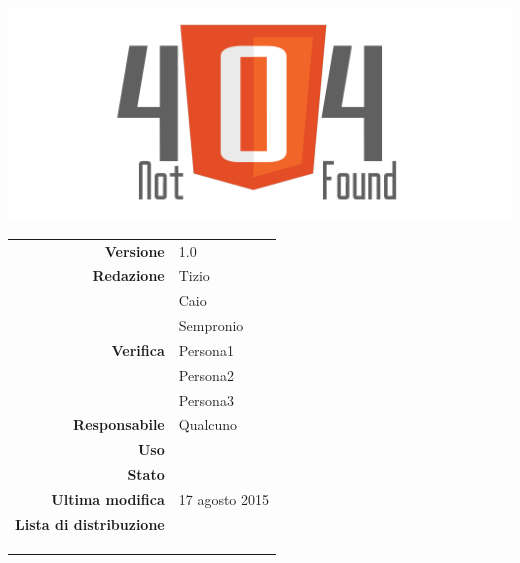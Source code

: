 \thispagestyle{empty}

\begin{titlepage}

	\begin{center}
	\begin{Huge}
		\textbf{\gruppo} \\
	\end{Huge}
	\vspace{0.5cm}
	\begin{Large}
		\textbf{\capitolato}
	\end{Large}
	
	\vspace{1cm}

	\includegraphics[scale=0.35]{../logo/logo404_Extends.png}
	\vspace{1cm}
	\begin{Huge}
		\textbf{\titDoc}
	\end{Huge}
	
	\vspace{1cm}
	
	\begin{table}[h]
	\begin{center}
	\begin{tabular}{r | l}
		\textbf{Versione} & 1.0 \\
		\textbf{Redazione} & Tizio \\ 
			& Caio \\ 
			& Sempronio \\
		\textbf{Verifica} & Persona1 \\ 
			& Persona2 \\ 
			& Persona3 \\
		\textbf{Responsabile} & Qualcuno \\
		\textbf{Uso} & \uso \\
		\textbf{Stato} & \stato \\
		\textbf{Ultima modifica} & 17 agosto 2015 \\
		\textbf{Lista di distribuzione} & \gruppo \\ 
			& \Vardanega \\
			& \Cardin \\
			& \Zucchetti \\
	\end{tabular}
	\end{center}
	\end{table}
	\end{center}
\end{titlepage}